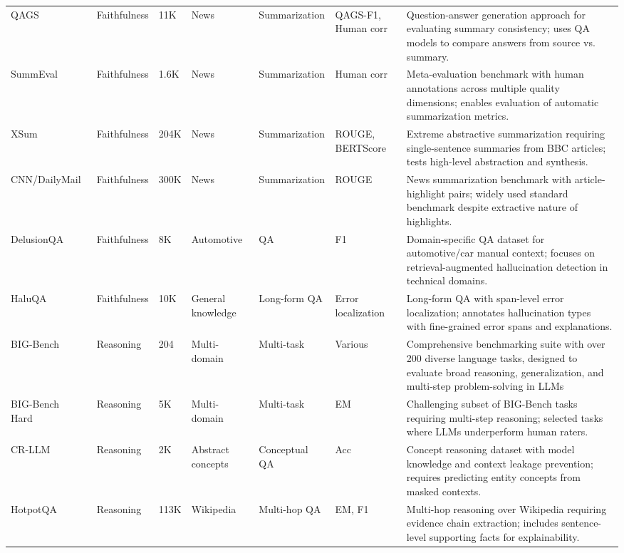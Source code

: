 \documentclass{llncs}
\begin{document}
\begin{table}[t]
{\begin{tabular}{l l l l l p{1.5cm} p{7cm}}
QAGS~\cite{wang2020qags} & Faithfulness & 11K & News & Summarization & QAGS-F1, Human corr & Question-answer generation approach for evaluating summary consistency; uses QA models to compare answers from source vs. summary. \\
SummEval~\cite{fabbri2021summeval} & Faithfulness & 1.6K & News & Summarization & Human corr & Meta-evaluation benchmark with human annotations across multiple quality dimensions; enables evaluation of automatic summarization metrics. \\
XSum~\cite{narayan2018xsum} & Faithfulness & 204K & News & Summarization & ROUGE, BERTScore & Extreme abstractive summarization requiring single-sentence summaries from BBC articles; tests high-level abstraction and synthesis. \\
CNN/DailyMail~\cite{hermann2015cnn} & Faithfulness & 300K & News & Summarization & ROUGE & News summarization benchmark with article-highlight pairs; widely used standard benchmark despite extractive nature of highlights. \\
DelusionQA~\cite{sadat2023delusionqa} & Faithfulness & 8K & Automotive & QA & F1 & Domain-specific QA dataset for automotive/car manual context; focuses on retrieval-augmented hallucination detection in technical domains. \\
HaluQA~\cite{cheng2023haluqa} & Faithfulness & 10K & General knowledge & Long-form QA & Error localization & Long-form QA with span-level error localization; annotates hallucination types with fine-grained error spans and explanations. \\
\hline
BIG-Bench~\cite{BIGBench2021} & Reasoning & 204 & Multi-domain & Multi-task & Various & Comprehensive benchmarking suite with over 200 diverse language tasks, designed to evaluate broad reasoning, generalization, and multi-step problem-solving in LLMs\\
BIG-Bench Hard~\cite{suzgun2023bigbenchhard,kazemi2025bigbenchxhard} & Reasoning & 5K & Multi-domain & Multi-task & EM & Challenging subset of BIG-Bench tasks requiring multi-step reasoning; selected tasks where LLMs underperform human raters. \\
CR-LLM~\cite{li2024crllm} & Reasoning & 2K & Abstract concepts & Conceptual QA & Acc & Concept reasoning dataset with model knowledge and context leakage prevention; requires predicting entity concepts from masked contexts. \\
HotpotQA~\cite{yang2018hotpotqa} & Reasoning & 113K & Wikipedia & Multi-hop QA & EM, F1 & Multi-hop reasoning over Wikipedia requiring evidence chain extraction; includes sentence-level supporting facts for explainability. \\

\end{tabular}}
\end{table}
\end{document}
